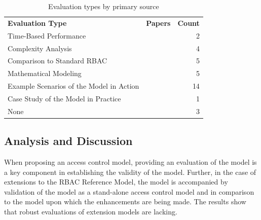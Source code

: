 \begin{table}
\centering
\caption{Evaluation types by primary source}
\vspace{0.1 in}
\begin{tabular*}{.9\linewidth}{| p{.45\linewidth} | p{.3\linewidth} | r | }
\cline{1-3}

\textbf{Evaluation Type} & \textbf{Papers} & \textbf{Count} \\ \cline{1-3}
Time-Based Performance
&
\cite{ni2010privacy}
\cite{aich09:role}
&
2 \\ \cline{1-3}
Complexity Analysis
&
\cite{bao08:role}
\cite{zhang06:collaborative}
\cite{aich07:STARBAC}
\cite{chen08:spatio-temporal}
&
4 \\ \cline{1-3}
Comparison to Standard RBAC
& 
\cite{bao08:role}
\cite{zou2009crbac}
\cite{zhang06:collaborative}
\cite{ray07:spatio}
\cite{zhao2008flexible}
&
5 \\ \cline{1-3}
Mathematical Modeling
& 
\cite{damiani2007geo}
\cite{hansen2003spatial}
\cite{aich07:STARBAC}
\cite{chen08:spatio-temporal}
\cite{joshi05:generalized}
&
5 \\ \cline{1-3}
Example Scenarios of the Model in Action
&
\cite{jian2008extended}
\cite{yao2008task}
\cite{cholewka00:acontext-sensitive}
\cite{huang06:pervasive}
\cite{bao08:role}
\cite{zhou2007team} 
\cite{alam06:constraint}
\cite{tzelepi01:flexible}
\cite{yamazaki04:designing}
\cite{zou2009crbac}
\cite{samuel07:spatio-temporal}
\cite{ray07:spatio}
\cite{joshi05:generalized}
\cite{oh2003task}
&
14 \\ \cline{1-3}
Case Study of the Model in Practice
&
\cite{motta03:contextual}
&
1 \\ \cline{1-3}
None
&
\cite{masoumzadeh2008purbac}
\cite{ray2006lrbac}
\cite{chandran05:llt}
&
3 \\ \cline{1-3}

\end{tabular*}
\label{tab:evaluations}
\end{table}

\subsection{Analysis and Discussion}

  
When proposing an access control model, providing an evaluation of the model is a key component in establishing the validity of the model. 
Further, in the case of extensions to the RBAC Reference Model, the model is accompanied by validation of the model as a stand-alone
access control model and in comparison to the model upon which the enhancements are being made. The results show that robust evaluations of
extension models are lacking. 

